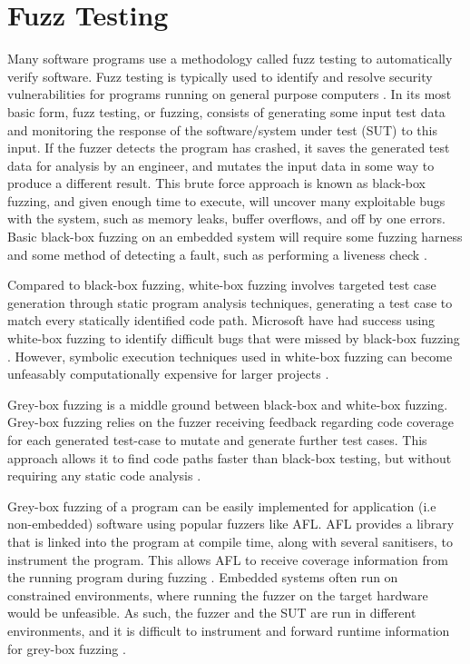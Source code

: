 \documentclass[../report.tex]{subfiles}
\begin{document}
\section{Fuzz Testing}


Many software programs use a methodology called fuzz testing to automatically
verify software. Fuzz testing is typically used to identify and resolve
security vulnerabilities for programs running on general purpose computers
\citep{Google_2023}. In its most basic form, fuzz testing, or fuzzing, consists
of generating some input test data and monitoring the response of the
software/system under test (SUT) to this input. If the fuzzer detects the
program has crashed, it saves the generated test data for analysis by an
engineer, and mutates the input data in some way to produce a different result.
This brute force approach is known as black-box fuzzing, and given enough time
to execute, will uncover many exploitable bugs with the system, such as memory
leaks, buffer overflows, and off by one errors. Basic black-box fuzzing on an
embedded system will require some fuzzing harness \citep{Eisele_et_al_2022} and
some method of detecting a fault, such as performing a liveness check
\citep{Yun_2022}.

Compared to black-box fuzzing, white-box fuzzing involves targeted test case
generation through static program analysis techniques, generating a test case
to match every statically identified code path. Microsoft have had success
using white-box fuzzing to identify difficult bugs that were missed by
black-box fuzzing \citep{Godefroid_2012}. However, symbolic execution
techniques used in white-box fuzzing can become unfeasably computationally
expensive for larger projects \citep{Krishnamoorthy_2010}.

Grey-box fuzzing is a middle ground between black-box and white-box fuzzing.
Grey-box fuzzing relies on the fuzzer receiving feedback regarding code
coverage for each generated test-case to mutate and generate further test
cases. This approach allows it to find code paths faster than black-box
testing, but without requiring any static code analysis \citep{Yun_2022}.

Grey-box fuzzing of a program can be easily implemented for application (i.e
non-embedded) software using popular fuzzers like AFL. AFL provides a library
that is linked into the program at compile time, along with several sanitisers,
to instrument the program. This allows AFL to receive coverage information from
the running program during fuzzing \citep{AFL_2019}. Embedded systems often run on
constrained environments, where running the fuzzer on the target hardware would
be unfeasible. %
As such, the fuzzer and the SUT are run in different
environments, and it is difficult to instrument and forward runtime information
for grey-box fuzzing \citep{Muench_2018}.
%
\end{document}
